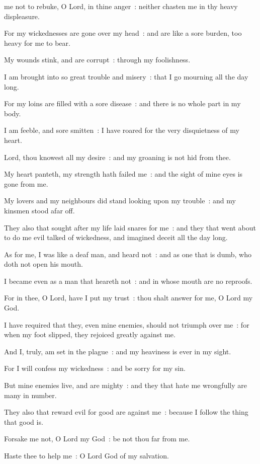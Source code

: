  me not to rebuke, O Lord, in thine anger~: neither chasten me in thy heavy displeasure.\par
{}
For my wickednesses are gone over my head~: and are like a sore burden, too heavy for me to bear.\par
{}My wounds stink, and are corrupt~: through my foolishness.\par
{}I am brought into so great trouble and misery~: that I go mourning all the day long.\par
{}For my loins are filled with a sore disease~: and there is no whole part in my body.\par
{}I am feeble, and sore smitten~: I have roared for the very disquietness of my heart.\par
{}Lord, thou knowest all my desire~: and my groaning is not hid from thee.\par
{}My heart panteth, my strength hath failed me~: and the sight of mine eyes is gone from me.\par
{}My lovers and my neighbours did stand looking upon my trouble~: and my kinsmen stood afar off.\par
{}They also that sought after my life laid snares for me~: and they that went about to do me evil talked of wickedness, and imagined deceit all the day long.\par
{}As for me, I was like a deaf man, and heard not~: and as one that is dumb, who doth not open his mouth.\par
{}I became even as a man that heareth not~: and in whose mouth are no reproofs.\par
{}For in thee, O Lord, have I put my trust~: thou shalt answer for me, O Lord my God.\par
{}I have required that they, even mine enemies, should not triumph over me~: for when my foot slipped, they rejoiced greatly against me.\par
{}And I, truly, am set in the plague~: and my heaviness is ever in my sight.\par
{}For I will confess my wickedness~: and be sorry for my sin.\par
{}But mine enemies live, and are mighty~: and they that hate me wrongfully are many in number.\par
{}They also that reward evil for good are against me~: because I follow the thing that good is.\par
{}Forsake me not, O Lord my God~: be not thou far from me.\par
{}Haste thee to help me~: O Lord God of my salvation.\par

